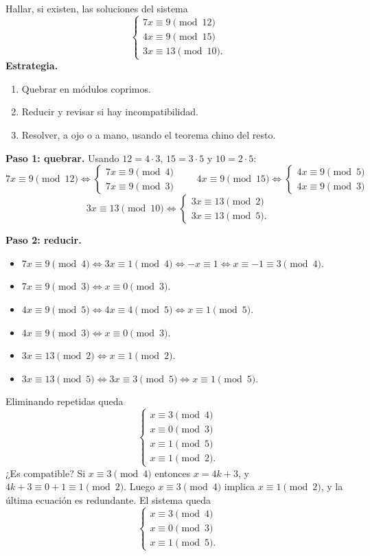 \begin{ejemplo}
Hallar, si existen, las soluciones del sistema
\[
\begin{cases}
7x\equiv 9 \pmod{12}\\
4x\equiv 9 \pmod{15}\\
3x\equiv 13 \pmod{10}.
\end{cases}
\]
\textbf{Estrategia.}
\begin{enumerate}
    \item Quebrar en módulos coprimos.
    \item Reducir y revisar si hay incompatibilidad.
    \item Resolver, a ojo o a mano, usando el teorema chino del resto.
\end{enumerate}

\textbf{Paso 1: quebrar.} Usando $12=4\cdot 3$, $15=3\cdot 5$ y $10=2\cdot 5$:
\[
7x\equiv 9 \pmod{12} \iff
\begin{cases} 7x\equiv 9 \pmod 4\\ 7x\equiv 9 \pmod 3 \end{cases}
\qquad
4x\equiv 9 \pmod{15} \iff
\begin{cases} 4x\equiv 9 \pmod 5\\ 4x\equiv 9 \pmod 3 \end{cases}
\]
\[
3x\equiv 13 \pmod{10} \iff
\begin{cases} 3x\equiv 13 \pmod 2\\ 3x\equiv 13 \pmod 5. \end{cases}
\]

\textbf{Paso 2: reducir.}
\begin{itemize}
    \item $7x\equiv 9 \pmod 4 \iff 3x\equiv 1 \pmod 4 \iff -x\equiv 1 \iff x\equiv -1\equiv 3 \pmod 4$.
    \item $7x\equiv 9 \pmod 3 \iff x\equiv 0 \pmod 3$.
    \item $4x\equiv 9 \pmod 5 \iff 4x\equiv 4 \pmod 5 \iff x\equiv 1 \pmod 5$.
    \item $4x\equiv 9 \pmod 3 \iff x\equiv 0 \pmod 3$.
    \item $3x\equiv 13 \pmod 2 \iff x\equiv 1 \pmod 2$.
    \item $3x\equiv 13 \pmod 5 \iff 3x\equiv 3 \pmod 5 \iff x\equiv 1 \pmod 5$.
\end{itemize}
Eliminando repetidas queda
\[
\begin{cases}
x\equiv 3 \pmod 4\\
x\equiv 0 \pmod 3\\
x\equiv 1 \pmod 5\\
x\equiv 1 \pmod 2.
\end{cases}
\]
¿Es compatible? Si $x\equiv 3 \pmod 4$ entonces $x=4k+3$, y
$4k+3\equiv 0+1\equiv 1 \pmod 2$. Luego $x\equiv 3 \pmod 4$ implica
$x\equiv 1 \pmod 2$, y la última ecuación es redundante. El sistema queda
\[
\begin{cases}
x\equiv 3 \pmod 4\\
x\equiv 0 \pmod 3\\
x\equiv 1 \pmod 5.
\end{cases}
\]


\end{ejemplo}

